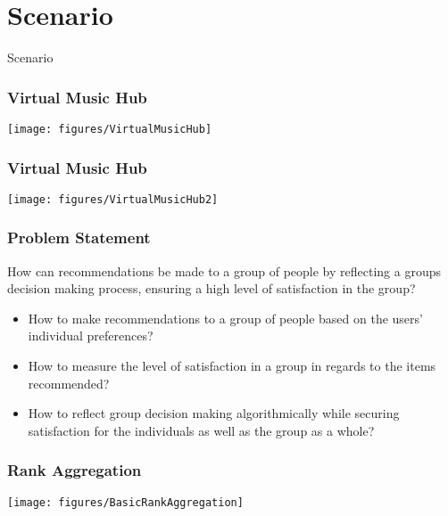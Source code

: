 \section{Scenario}

\begin{frame}
	\begin{center}
		\huge Scenario
	\end{center}
\end{frame}

\begin{frame}
	\frametitle{Virtual Music Hub}
	\centering
	\texttt{[image: figures/VirtualMusicHub]}
\end{frame}

\begin{frame}
	\frametitle{Virtual Music Hub}
	\centering
	\texttt{[image: figures/VirtualMusicHub2]}
\end{frame}

\begin{frame}
	\frametitle{Problem Statement}
	How can recommendations be made to a group of people by reflecting a groups decision making process, ensuring a high level of satisfaction in the group?
	\begin{itemize}
		\item How to make recommendations to a group of people based on the users' individual preferences?
		\item How to measure the level of satisfaction in a group in regards to the items recommended?
		\item How to reflect group decision making algorithmically while securing satisfaction for the individuals as well as the group as a whole?
	\end{itemize}
\end{frame}

\begin{frame}
	\frametitle{Rank Aggregation}
	\centering
	\texttt{[image: figures/BasicRankAggregation]}
\end{frame}